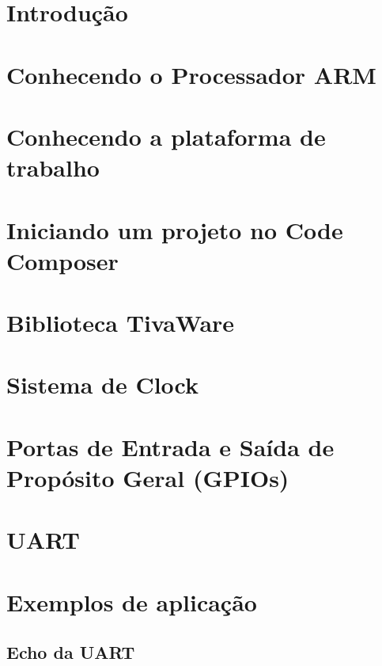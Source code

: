 \documentclass[a4paper,10pt]{book}
\begin{document}
\maketitle

\section{Introdução}


\section{Conhecendo o Processador ARM}


\section{Conhecendo a plataforma de trabalho}


\section{Iniciando um projeto no Code Composer}


\section{Biblioteca TivaWare}


\section{Sistema de Clock}


\section{Portas de Entrada e Saída de Propósito Geral (GPIOs)}


\section{UART}


\section{Exemplos de aplicação}

\subsection{Echo da UART}





\end{document}
